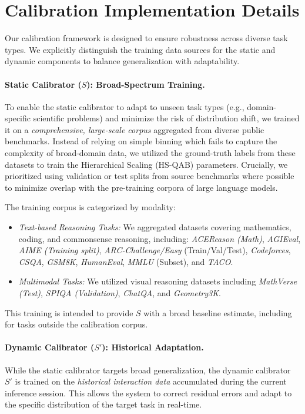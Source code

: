 \documentclass[11pt]{article}
\begin{document}
\section{Calibration Implementation Details}
\label{app:calib_details}

Our calibration framework is designed to ensure robustness across diverse task types. We explicitly distinguish the training data sources for the static and dynamic components to balance generalization with adaptability.

\paragraph{Static Calibrator ($S$): Broad-Spectrum Training.}
To enable the static calibrator to adapt to unseen task types (e.g., domain-specific scientific problems) and minimize the risk of distribution shift, we trained it on a \emph{comprehensive, large-scale corpus} aggregated from diverse public benchmarks.
Instead of relying on simple binning which fails to capture the complexity of broad-domain data, we utilized the ground-truth labels from these datasets to train the Hierarchical Scaling (HS-QAB) parameters.
Crucially, we prioritized using validation or test splits from source benchmarks where possible to minimize overlap with the pre-training corpora of large language models.

The training corpus is categorized by modality:
\begin{itemize}
    \item \emph{Text-based Reasoning Tasks:} We aggregated datasets covering mathematics, coding, and commonsense reasoning, including:
    \textit{ACEReason (Math)}, \textit{AGIEval}, \textit{AIME (Training split)}, \textit{ARC-Challenge/Easy} (Train/Val/Test), \textit{Codeforces}, \textit{CSQA}, \textit{GSM8K}, \textit{HumanEval}, \textit{MMLU} (Subset), and \textit{TACO}.
    \item \emph{Multimodal Tasks:} We utilized visual reasoning datasets including \textit{MathVerse (Test)}, \textit{SPIQA (Validation)}, \textit{ChatQA}, and \textit{Geometry3K}.
\end{itemize}
This training is intended to provide $S$ with a broad baseline estimate, including for tasks outside the calibration corpus.

\paragraph{Dynamic Calibrator ($S'$): Historical Adaptation.}
While the static calibrator targets broad generalization, the dynamic calibrator $S'$ is trained on the \emph{historical interaction data} accumulated during the current inference session.
This allows the system to correct residual errors and adapt to the specific distribution of the target task in real-time.
\end{document}
